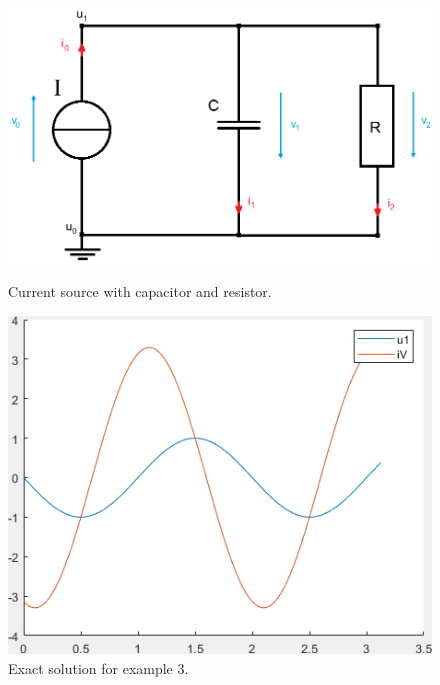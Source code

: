 \begin{frame}[noframenumbering]
	\begin{figure}[H]
		\centering
		\begin{minipage}{.5\textwidth}
			\centering
			\includegraphics[width=\linewidth]{../Tex/pictures/Example3.png}
			\caption{Current source with capacitor and resistor.}
			\label{fig:num ex3}
		\end{minipage}%
		\begin{minipage}{.5\textwidth}
			\centering
			\includegraphics[width=\linewidth]{../Matlab/exact_solution_ex3.png}
			\caption{Exact solution for example 3.}
			\label{fig: Exact solution for example 3}
		\end{minipage}
	\end{figure}
\end{frame}

